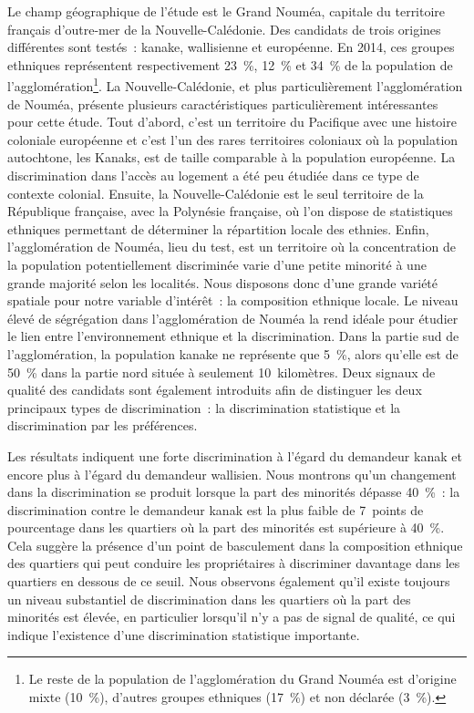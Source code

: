 \documentclass[10pt]{Revue-economique} %
\begin{document}
Le champ géographique de l’étude est le Grand Nouméa, capitale du territoire français d’outre-mer de la Nouvelle-Calédonie. Des candidats de trois origines différentes sont testés : kanake, wallisienne et européenne. En 2014, ces groupes ethniques représentent respectivement 23 \%, 12 \% et 34 \% de la population de l’agglomération\footnote{Le reste de la population de l’agglomération du Grand Nouméa est d’origine mixte (10 \%), d’autres groupes ethniques (17 \%) et non déclarée (3 \%).}. La Nouvelle-Calédonie, et plus particulièrement l’agglomération de Nouméa, présente plusieurs caractéristiques particulièrement intéressantes pour cette étude. Tout d’abord, c’est un territoire du Pacifique avec une histoire coloniale européenne et c’est l’un des rares territoires coloniaux où la population autochtone, les Kanaks, est de taille comparable à la population européenne. La discrimination dans l’accès au logement a été peu étudiée dans ce type de contexte colonial. Ensuite, la Nouvelle-Calédonie est le seul territoire de la République française, avec la Polynésie française, où l’on dispose de statistiques ethniques permettant de déterminer la répartition locale des ethnies. Enfin, l’agglomération de Nouméa, lieu du test, est un territoire où la concentration de la population potentiellement discriminée varie d’une petite minorité à une grande majorité selon les localités. Nous disposons donc d’une grande variété spatiale pour notre variable d’intérêt : la composition ethnique locale. Le niveau élevé de ségrégation dans l’agglomération de Nouméa la rend idéale pour étudier le lien entre l’environnement ethnique et la discrimination. Dans la partie sud de l’agglomération, la population kanake ne représente que 5 \%, alors qu’elle est de 50 \% dans la partie nord située à seulement 10 kilomètres. Deux signaux de qualité des candidats sont également introduits afin de distinguer les deux principaux types de discrimination : la discrimination statistique et la discrimination par les préférences.

Les résultats indiquent une forte discrimination à l’égard du demandeur kanak et encore plus à l’égard du demandeur wallisien. Nous montrons qu’un changement dans la discrimination se produit lorsque la part des minorités dépasse 40 \% : la discrimination contre le demandeur kanak est la plus faible de 7 points de pourcentage dans les quartiers où la part des minorités est supérieure à 40 \%. Cela suggère la présence d’un point de basculement dans la composition ethnique des quartiers qui peut conduire les propriétaires à discriminer davantage dans les quartiers en dessous de ce seuil. Nous observons également qu’il existe toujours un niveau substantiel de discrimination dans les quartiers où la part des minorités est élevée, en particulier lorsqu’il n’y a pas de signal de qualité, ce qui indique l’existence d’une discrimination statistique importante.
\end{document}
